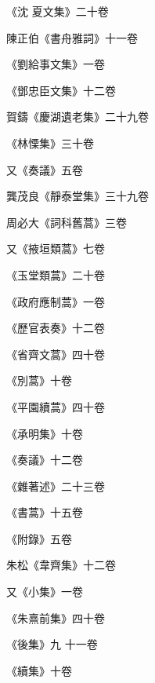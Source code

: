 \begin{pinyinscope}
 《沈
 夏文集》二十卷



 陳正伯《書舟雅詞》十一卷



 《劉給事文集》一卷



 《鄧忠臣文集》十二卷



 賀鑄《慶湖遺老集》二十九卷



 《林慄集》三十卷



 又《奏議》五卷



 龔茂良《靜泰堂集》三十九卷



 周必大《詞科舊蒿》三卷



 又《掖垣類蒿》七卷



 《玉堂類蒿》二十卷



 《政府應制蒿》一卷



 《歷官表奏》十二卷



 《省齊文蒿》四十卷



 《別蒿》十卷



 《平園續蒿》四十卷



 《承明集》十卷



 《奏議》十二卷



 《雜著述》二十三卷



 《書蒿》十五卷



 《附錄》五卷



 朱松《韋齊集》十二卷



 又《小集》一卷



 《朱熹前集》四十卷



 《後集》九
 十一卷



 《續集》十卷




\end{pinyinscope}
